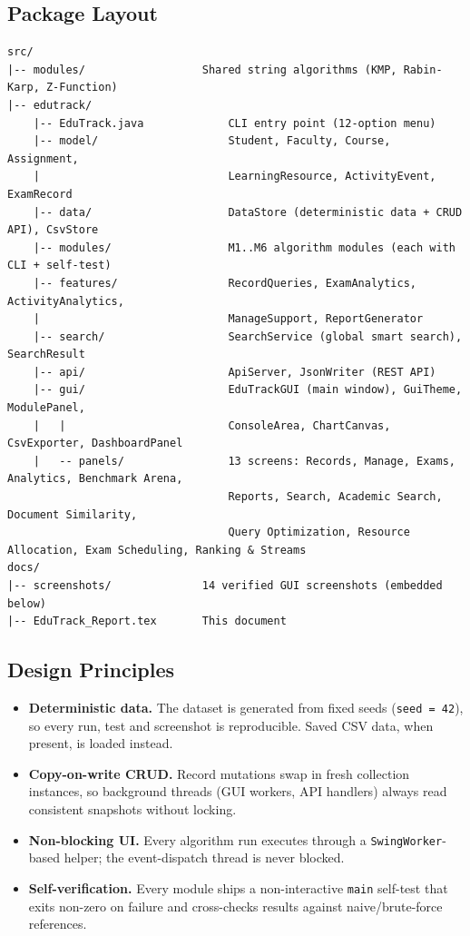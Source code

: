 \documentclass[11pt,a4paper]{article}
\begin{document}
\subsection{Package Layout}
\begin{lstlisting}
src/
|-- modules/                  Shared string algorithms (KMP, Rabin-Karp, Z-Function)
|-- edutrack/
    |-- EduTrack.java             CLI entry point (12-option menu)
    |-- model/                    Student, Faculty, Course, Assignment,
    |                             LearningResource, ActivityEvent, ExamRecord
    |-- data/                     DataStore (deterministic data + CRUD API), CsvStore
    |-- modules/                  M1..M6 algorithm modules (each with CLI + self-test)
    |-- features/                 RecordQueries, ExamAnalytics, ActivityAnalytics,
    |                             ManageSupport, ReportGenerator
    |-- search/                   SearchService (global smart search), SearchResult
    |-- api/                      ApiServer, JsonWriter (REST API)
    |-- gui/                      EduTrackGUI (main window), GuiTheme, ModulePanel,
    |   |                         ConsoleArea, ChartCanvas, CsvExporter, DashboardPanel
    |   -- panels/                13 screens: Records, Manage, Exams, Analytics, Benchmark Arena,
                                  Reports, Search, Academic Search, Document Similarity,
                                  Query Optimization, Resource Allocation, Exam Scheduling, Ranking & Streams
docs/
|-- screenshots/              14 verified GUI screenshots (embedded below)
|-- EduTrack_Report.tex       This document
\end{lstlisting}

\subsection{Design Principles}
\begin{itemize}
    \item \textbf{Deterministic data.} The dataset is generated from fixed seeds
    (\texttt{seed = 42}), so every run, test and screenshot is reproducible. Saved CSV
    data, when present, is loaded instead.
    \item \textbf{Copy-on-write CRUD.} Record mutations swap in fresh collection
    instances, so background threads (GUI workers, API handlers) always read consistent
    snapshots without locking.
    \item \textbf{Non-blocking UI.} Every algorithm run executes through a
    \texttt{SwingWorker}-based helper; the event-dispatch thread is never blocked.
    \item \textbf{Self-verification.} Every module ships a non-interactive
    \texttt{main} self-test that exits non-zero on failure and cross-checks results
    against naive/brute-force references.
\end{itemize}
\end{document}
